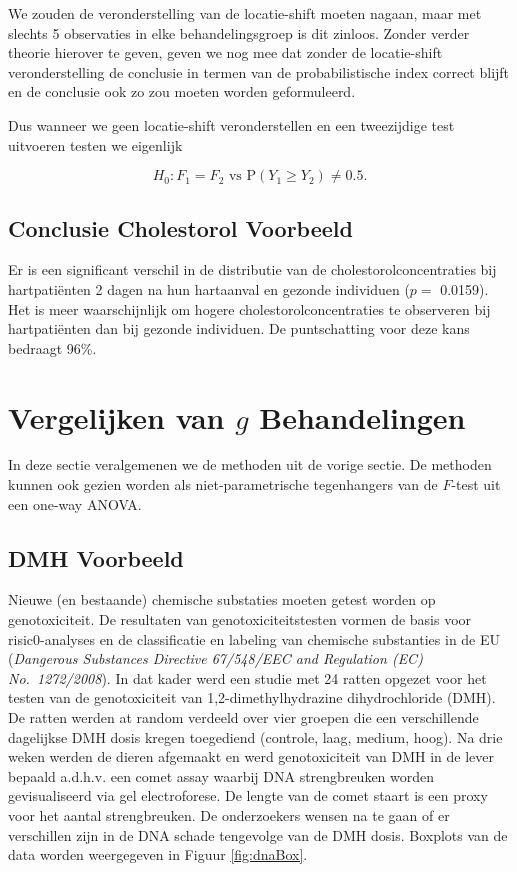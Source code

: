 \documentclass[
  12pt,dutch,coursenotes]{book}
\theoremstyle{definition}
\theoremstyle{definition}
\theoremstyle{definition}
\theoremstyle{remark}
\begin{document}
We zouden de veronderstelling van de locatie-shift moeten nagaan, maar met slechts 5 observaties in elke behandelingsgroep is dit zinloos. Zonder verder theorie hierover te geven, geven we nog mee dat zonder de locatie-shift veronderstelling de conclusie in termen van de probabilistische index correct blijft en de conclusie ook zo zou moeten worden geformuleerd.

Dus wanneer we geen locatie-shift veronderstellen en een tweezijdige test uitvoeren testen we eigenlijk

\[H_0: F_1=F_2 \text{ vs P}(Y_1 \geq Y_2) \neq 0.5.\]

\hypertarget{conclusie-cholestorol-voorbeeld}{%
\subsection{Conclusie Cholestorol Voorbeeld}\label{conclusie-cholestorol-voorbeeld}}

Er is een significant verschil in de distributie van de cholestorolconcentraties bij hartpatiënten 2 dagen na hun hartaanval en gezonde individuen (\(p=\) 0.0159). Het is meer waarschijnlijk om hogere cholestorolconcentraties te observeren bij hartpatiënten dan bij gezonde individuen. De puntschatting voor deze kans bedraagt 96\%.

\hypertarget{vergelijken-van-g-behandelingen}{%
\section{\texorpdfstring{Vergelijken van \(g\) Behandelingen}{Vergelijken van g Behandelingen}}\label{vergelijken-van-g-behandelingen}}

In deze sectie veralgemenen we de methoden uit de vorige sectie.
De methoden kunnen ook gezien worden
als niet-parametrische tegenhangers van de \(F\)-test uit een one-way ANOVA.

\hypertarget{dmh-voorbeeld}{%
\subsection{DMH Voorbeeld}\label{dmh-voorbeeld}}

Nieuwe (en bestaande) chemische substaties moeten getest worden op genotoxiciteit. De resultaten van genotoxiciteitstesten vormen de basis voor risic0-analyses en de classificatie en labeling van chemische substanties in de EU (\emph{Dangerous Substances Directive 67/548/EEC and Regulation (EC) No.~1272/2008}). In dat kader werd een studie met 24 ratten opgezet voor het testen van de genotoxiciteit van 1,2-dimethylhydrazine dihydrochloride (DMH).
De ratten werden at random verdeeld over vier groepen die een verschillende dagelijkse DMH dosis kregen toegediend (controle, laag, medium, hoog).
Na drie weken werden de dieren afgemaakt en werd genotoxiciteit van DMH in de lever bepaald a.d.h.v. een comet assay waarbij DNA strengbreuken worden gevisualiseerd via gel electroforese.
De lengte van de comet staart is een proxy voor het aantal strengbreuken.
De onderzoekers wensen na te gaan of er verschillen zijn in de DNA schade tengevolge van de DMH dosis.
Boxplots van de data worden weergegeven in Figuur \ref{fig:dnaBox}.
\end{document}
